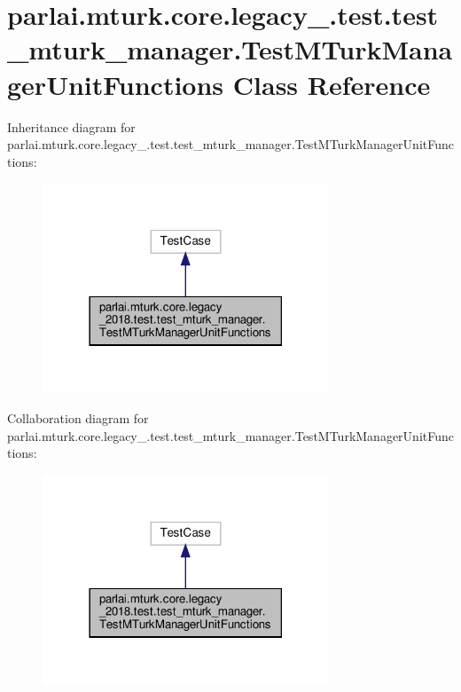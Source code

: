 \hypertarget{classparlai_1_1mturk_1_1core_1_1legacy__2018_1_1test_1_1test__mturk__manager_1_1TestMTurkManagerUnitFunctions}{}\section{parlai.\+mturk.\+core.\+legacy\+\_.\+test.\+test\+\_\+mturk\+\_\+manager.\+Test\+M\+Turk\+Manager\+Unit\+Functions Class Reference}
\label{classparlai_1_1mturk_1_1core_1_1legacy__2018_1_1test_1_1test__mturk__manager_1_1TestMTurkManagerUnitFunctions}


Inheritance diagram for parlai.\+mturk.\+core.\+legacy\+\_.\+test.\+test\+\_\+mturk\+\_\+manager.\+Test\+M\+Turk\+Manager\+Unit\+Functions\+:\nopagebreak
\begin{figure}[H]
\begin{center}
\leavevmode
\includegraphics[width=242pt]{de/d3d/classparlai_1_1mturk_1_1core_1_1legacy__2018_1_1test_1_1test__mturk__manager_1_1TestMTurkManagerUnitFunctions__inherit__graph}
\end{center}
\end{figure}


Collaboration diagram for parlai.\+mturk.\+core.\+legacy\+\_.\+test.\+test\+\_\+mturk\+\_\+manager.\+Test\+M\+Turk\+Manager\+Unit\+Functions\+:\nopagebreak
\begin{figure}[H]
\begin{center}
\leavevmode
\includegraphics[width=242pt]{d1/dbe/classparlai_1_1mturk_1_1core_1_1legacy__2018_1_1test_1_1test__mturk__manager_1_1TestMTurkManagerUnitFunctions__coll__graph}
\end{center}
\end{figure}
